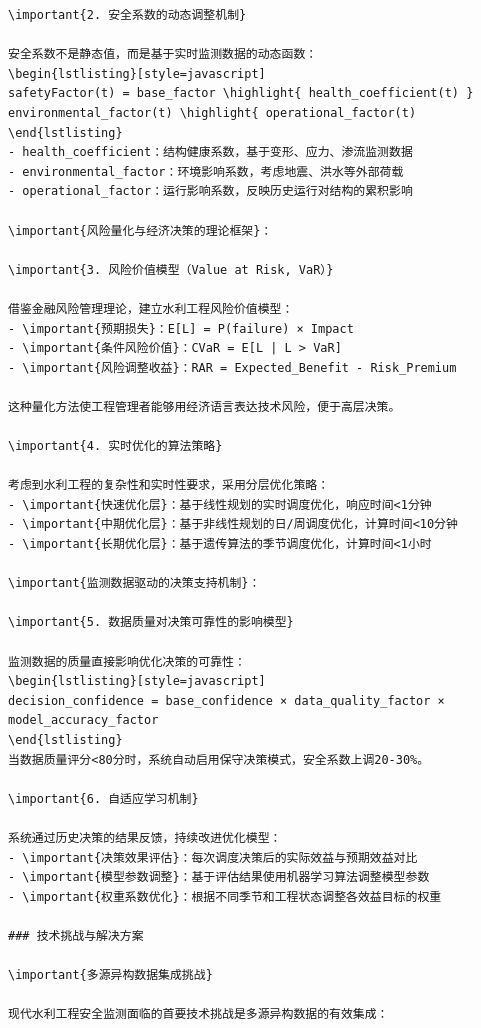 \begin{verbatim}
\important{2. 安全系数的动态调整机制}

安全系数不是静态值，而是基于实时监测数据的动态函数：
\begin{lstlisting}[style=javascript]
safetyFactor(t) = base_factor \highlight{ health_coefficient(t) } environmental_factor(t) \highlight{ operational_factor(t)
\end{lstlisting}
- health_coefficient：结构健康系数，基于变形、应力、渗流监测数据
- environmental_factor：环境影响系数，考虑地震、洪水等外部荷载
- operational_factor：运行影响系数，反映历史运行对结构的累积影响

\important{风险量化与经济决策的理论框架}：

\important{3. 风险价值模型（Value at Risk, VaR）}

借鉴金融风险管理理论，建立水利工程风险价值模型：
- \important{预期损失}：E[L] = P(failure) × Impact
- \important{条件风险价值}：CVaR = E[L | L > VaR]
- \important{风险调整收益}：RAR = Expected_Benefit - Risk_Premium

这种量化方法使工程管理者能够用经济语言表达技术风险，便于高层决策。

\important{4. 实时优化的算法策略}

考虑到水利工程的复杂性和实时性要求，采用分层优化策略：
- \important{快速优化层}：基于线性规划的实时调度优化，响应时间<1分钟
- \important{中期优化层}：基于非线性规划的日/周调度优化，计算时间<10分钟
- \important{长期优化层}：基于遗传算法的季节调度优化，计算时间<1小时

\important{监测数据驱动的决策支持机制}：

\important{5. 数据质量对决策可靠性的影响模型}

监测数据的质量直接影响优化决策的可靠性：
\begin{lstlisting}[style=javascript]
decision_confidence = base_confidence × data_quality_factor × model_accuracy_factor
\end{lstlisting}
当数据质量评分<80分时，系统自动启用保守决策模式，安全系数上调20-30%。

\important{6. 自适应学习机制}

系统通过历史决策的结果反馈，持续改进优化模型：
- \important{决策效果评估}：每次调度决策后的实际效益与预期效益对比
- \important{模型参数调整}：基于评估结果使用机器学习算法调整模型参数
- \important{权重系数优化}：根据不同季节和工程状态调整各效益目标的权重

### 技术挑战与解决方案

\important{多源异构数据集成挑战}

现代水利工程安全监测面临的首要技术挑战是多源异构数据的有效集成：


\end{verbatim}
